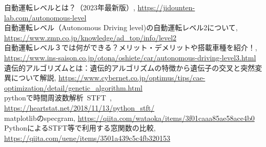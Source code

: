 \documentclass[dvipdfmx,uplatex]{jsarticle}
\begin{document}
    \begin{thebibliography}{99}
      自動運転レベルとは？（2023年最新版）, \url{https://jidounten-lab.com/autonomous-level} \\
      自動運転レベル（Autonomous Driving level)の自動運転レベル2について, \url{https://www.zmp.co.jp/knowledge/ad_top/info/level2} \\
      自動運転レベル３では何ができる？メリット・デメリットや搭載車種を紹介！, \url{https://www.ins-saison.co.jp/otona/oshiete/car/autonomous-driving-level3.html} \\
      遺伝的アルゴリズムとは：遺伝的アルゴリズムの特徴から遺伝子の交叉と突然変異について解説, \url{https://www.cybernet.co.jp/optimus/tips/cae-optimization/detail/genetic_algorithm.html} \\
      pythonで時間周波数解析~STFT~, \url{https://heartstat.net/2018/11/13/python_stft/} \\
      matplotlibのspecgram, \url{https://qiita.com/wataoka/items/3f01caaa85ae58ace4b0} \\
      PythonによるSTFT等で利用する窓関数の比較, \url{https://qiita.com/uene/items/3501a439c5c4fb320153} \\
    \end{thebibliography}
\end{document}
